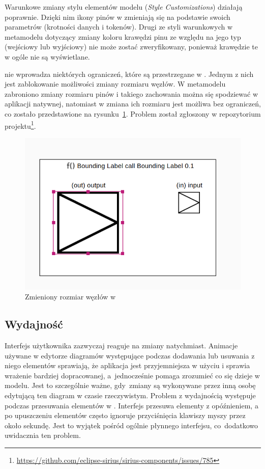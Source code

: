 Warunkowe zmiany stylu elementów modelu (\emph{Style Customizations}) działają
poprawnie. Dzięki nim ikony pinów w \SiriusWeb{} zmieniają się na
podstawie swoich parametrów (krotności danych i tokenów). Drugi ze styli
warunkowych w metamodelu dotyczący zmiany koloru krawędzi pinu ze względu na
jego typ (wejściowy lub wyjściowy) nie może zostać zweryfikowany, ponieważ
krawędzie te w ogóle nie są wyświetlane.

\SiriusWeb{} nie wprowadza niektórych ograniczeń, które są przestrzegane w
\SiriusDesktop{}. Jednym z nich jest zablokowanie możliwości zmiany
rozmiaru węzłów. W metamodelu zabroniono zmiany rozmiaru pinów i takiego
zachowania można się spodziewać w aplikacji natywnej, natomiast w \SiriusWeb{}
zmiana ich rozmiaru jest możliwa bez ograniczeń, co zostało
przedstawione na
rysunku~\ref{rys:change-node-size}. Problem został zgłoszony w repozytorium
projektu\footnote{
	\url{https://github.com/eclipse-sirius/sirius-components/issues/785}}.

\begin{figure}[h]
  \centering

  \includegraphics[width=0.6\linewidth]{./images/change-node-size.png}
  \caption{Zmieniony rozmiar węzłów w \SiriusWeb{}}\label{rys:change-node-size}
\end{figure}

\subsection{Wydajność}

Interfejs użytkownika \SiriusWeb{} zazwyczaj reaguje na zmiany natychmiast.
Animacje używane w edytorze diagramów występujące podczas dodawania lub
usuwania z niego elementów sprawiają, że aplikacja jest przyjemniejsza w użyciu
i sprawia wrażenie bardziej dopracowanej, a~jednocześnie pomaga zrozumieć co
się dzieje w modelu. Jest to szczególnie ważne, gdy~zmiany są wykonywane przez
inną osobę edytującą ten diagram w czasie rzeczywistym.
Problem z wydajnością występuje podczas przesuwania elementów w \SiriusWeb{}.
Interfejs przesuwa elementy z opóźnieniem, a po upuszczeniu
elementów
często ignoruje przyciśnięcia klawiszy myszy przez około sekundę. Jest to
wyjątek pośród ogólnie płynnego interfejsu, co~dodatkowo uwidacznia ten
problem.

